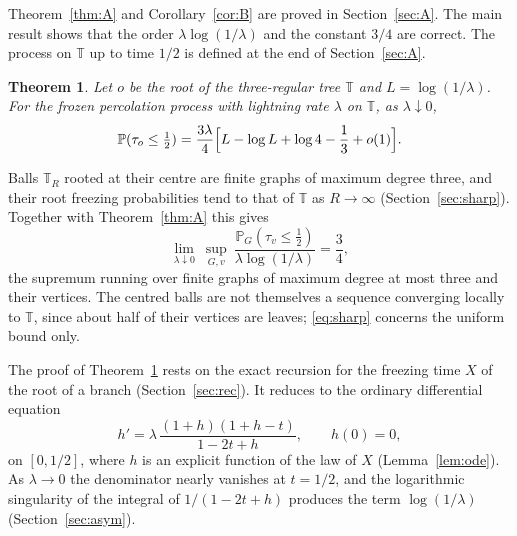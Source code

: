 \documentclass[11pt]{amsart}
\newtheorem{theorem}{Theorem}
\theoremstyle{remark}
\numberwithin{equation}{section}
\newcommand{\T}{\mathbb{T}}
\newcommand{\PP}{\mathbb{P}}
\begin{document}
Theorem~\ref{thm:A} and Corollary~\ref{cor:B} are proved in
Section~\ref{sec:A}. The main result shows that the order
$\lambda\log(1/\lambda)$ and the constant $3/4$ are correct. The process
on $\T$ up to time $1/2$ is defined at the end of Section~\ref{sec:A}.

\begin{theorem}\label{thm:C}
Let $o$ be the root of the three-regular tree $\T$ and $L=\log(1/\lambda)$.
For the frozen percolation process with lightning rate $\lambda$ on $\T$,
as $\lambda\downarrow0$,
\begin{equation}\label{eq:C1}
\PP(\tau_o\le\tfrac12)=\frac{3\lambda}{4}\Bigl[L-\log L+\log4-\frac13+o(1)\Bigr].
\end{equation}
\end{theorem}

Balls $\T_R$ rooted at their centre are finite graphs of maximum degree
three, and their root freezing probabilities tend to that of $\T$ as
$R\to\infty$ (Section~\ref{sec:sharp}). Together with
Theorem~\ref{thm:A} this gives
\begin{equation}\label{eq:sharp}
\lim_{\lambda\downarrow0}\ \sup_{G,v}\
\frac{\PP_G(\tau_v\le\frac12)}{\lambda\log(1/\lambda)}=\frac34,
\end{equation}
the supremum running over finite graphs of maximum degree at most three
and their vertices. The centred balls are not themselves a sequence
converging locally to $\T$, since about half of their vertices are
leaves; \eqref{eq:sharp} concerns the uniform bound only.

The proof of Theorem~\ref{thm:C} rests on the exact recursion for the
freezing time $X$ of the root of a branch (Section~\ref{sec:rec}). It
reduces to the ordinary differential equation
\[
h'=\lambda\,\frac{(1+h)(1+h-t)}{1-2t+h},\qquad h(0)=0,
\]
on $[0,1/2]$, where $h$ is an explicit function of the law of $X$
(Lemma~\ref{lem:ode}). As $\lambda\to0$ the denominator nearly
vanishes at $t=1/2$, and the logarithmic singularity of the integral of
$1/(1-2t+h)$ produces the term $\log(1/\lambda)$ (Section~\ref{sec:asym}).
\end{document}
